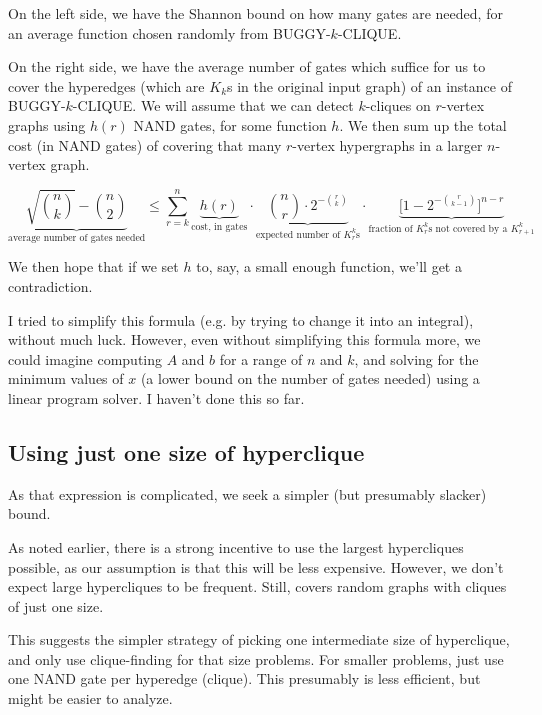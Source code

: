 \documentclass[12pt]{article}
\theoremstyle{definition}
\begin{document}
On the left side, we have
the Shannon bound on how many gates are needed, for an average function
chosen randomly from BUGGY-$k$-CLIQUE.

On the right side, we have
the average number of gates which suffice for us to cover the hyperedges
(which are $K_k$s in the original input graph) of an instance of
BUGGY-$k$-CLIQUE.
We will assume that we can detect $k$-cliques on $r$-vertex graphs using
$h(r)$ NAND gates, for some function $h$.
We then sum up the total cost (in NAND gates)
of covering that many $r$-vertex hypergraphs in a larger $n$-vertex graph.

\[
\underbrace{\sqrt{n \choose k} - {n \choose 2}}_\text{average number of gates needed}
\le \sum_{r=k}^n
\underbrace{h(r)}_\text{cost, in gates}
\cdot
\underbrace{{n \choose r} \cdot 2^{-{r \choose k}}}_\text{expected number of $K_r^k$s}
\cdot
\underbrace{\Big[1 - 2^{-{r \choose {k-1}}}\Big]^{n - r}}_\text{fraction of $K_r^k$s not covered by a $K_{r+1}^k$}
\]

We then hope that if we set $h$ to, say, a small enough
function, we'll get a contradiction.

I tried to simplify this formula (e.g. by trying to change it into an
integral), without much luck.
However, even
without simplifying this formula more, we could imagine computing $A$ and
$b$ for a range of $n$ and $k$, and solving for the minimum values of
$x$ (a lower bound on the
number of gates needed) using a linear program solver.
I haven't done this so far.

\subsection{Using just one size of hyperclique}

As that expression is complicated, we seek a simpler (but
presumably slacker) bound.

As noted earlier, there is a strong incentive to use the largest
hypercliques possible, as our assumption is that this will be less
expensive. However, we don't expect large hypercliques to be frequent.
Still, 
\cite{bollobas1993clique} covers random graphs with cliques of just
one size.

This suggests the simpler strategy of picking one intermediate
size of hyperclique,
and only use clique-finding for that size problems. For smaller problems,
just use one NAND gate per hyperedge (clique).
This presumably is less efficient, but might be easier to analyze.
\end{document}
